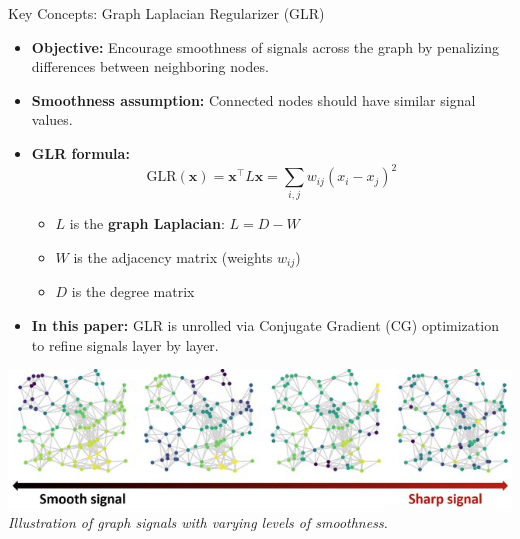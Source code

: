 \documentclass[aspectratio=169,xcolor=dvipsnames]{beamer}
\begin{document}
\begin{frame}{Key Concepts: Graph Laplacian Regularizer (GLR)}

\begin{itemize}
    \item \textbf{Objective:} Encourage smoothness of signals across the graph by penalizing differences between neighboring nodes.
    

    \item \textbf{Smoothness assumption:} Connected nodes should have similar signal values.
    

    \item \textbf{GLR formula:}
    \vspace{-0.3cm}
    \[
        \text{GLR}(\mathbf{x}) = \mathbf{x}^\top L \mathbf{x} = \sum_{i,j} w_{ij} (x_i - x_j)^2
    \]
    \vspace{-0.5cm}
    \begin{itemize}
        \item $L$ is the \textbf{graph Laplacian}: $L = D - W$
        \item $W$ is the adjacency matrix (weights $w_{ij}$)
        \item $D$ is the degree matrix
    \end{itemize}
    
    \item \textbf{In this paper:} GLR is unrolled via Conjugate Gradient (CG) optimization to refine signals layer by layer.

\end{itemize}

\begin{center}
    \includegraphics[width=0.55\linewidth]{smoothness.png}
    \vspace{0.2cm}
    \\\tiny \textit{Illustration of graph signals with varying levels of smoothness.}
\end{center}


\end{frame}
\end{document}
